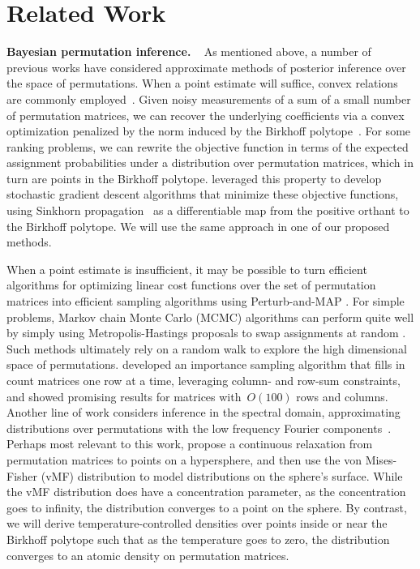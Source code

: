 \documentclass[twoside]{article}
\DeclareRobustCommand{\parhead}[1]{\textbf{#1}~}
\begin{document}
\section{Related Work}
\label{sec:relatedwork}

\parhead{Bayesian permutation inference. } As mentioned above, a
number of previous works have considered approximate methods of
posterior inference over the space of permutations. When a point
estimate will suffice, convex relations are commonly employed~\citep{fogel2013convex,
  lim2014beyond}. Given noisy measurements of a sum of a small number of
permutation matrices, we can recover the underlying coefficients
via a convex optimization penalized by the norm induced by the Birkhoff
polytope~\citep{chandrasekaran2012convex}.  For some ranking problems,
we can rewrite the objective function in terms of the expected 
assignment probabilities under a distribution over permutation matrices, which
in turn are points in the Birkhoff polytope. \citet{adams2011ranking}
leveraged this property to develop stochastic gradient descent algorithms
that minimize these objective functions, using Sinkhorn propagation~\citep{knight2008sinkhorn}
as a differentiable map from the positive orthant to the Birkhoff polytope.
We will use the same approach in one of our proposed methods. 


When a point estimate is insufficient, it may be possible to turn
efficient algorithms for optimizing linear cost functions over the set
of permutation matrices into efficient sampling algorithms using
Perturb-and-MAP \citep{li2013efficient}.  For simple problems, Markov
chain Monte Carlo (MCMC) algorithms can perform quite well by simply
using Metropolis-Hastings proposals to swap assignments at random
\citep{diaconis1988group}.  Such methods ultimately rely on a random
walk to explore the high dimensional space of permutations.
\citet{harrison2013importance} developed an importance sampling
algorithm that fills in count matrices one row at a time, leveraging
column- and row-sum constraints, and showed promising results for
matrices with~$O(100)$ rows and columns.  Another line of work
considers inference in the spectral domain, approximating
distributions over permutations with the low frequency Fourier
components~\citep{kondor2007multi, huang2009fourier}.  Perhaps most
relevant to this work, \citet{plis2011directional} propose a
continuous relaxation from permutation matrices to points on a
hypersphere, and then use the von Mises-Fisher (vMF) distribution to
model distributions on the sphere's surface. While the vMF
distribution does have a concentration parameter, as the concentration
goes to infinity, the distribution converges to a point on the sphere.
By contrast, we will derive temperature-controlled densities over
points inside or near the Birkhoff polytope such that as the temperature
goes to zero, the distribution converges to an atomic density on
permutation matrices.
\end{document}
